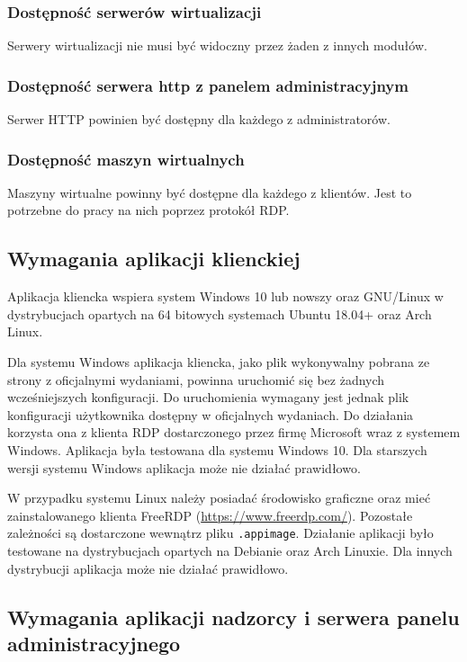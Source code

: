 \documentclass[../opis-rozwiazania.tex]{subfiles}
\begin{document}
\subsubsection{Dostępność serwerów wirtualizacji}
Serwery wirtualizacji nie musi być widoczny przez żaden z innych modułów.

\subsubsection{Dostępność serwera http z panelem administracyjnym}
Serwer HTTP powinien być dostępny dla każdego z administratorów.

\subsubsection{Dostępność maszyn wirtualnych}
Maszyny wirtualne powinny być dostępne dla każdego z klientów.
Jest to potrzebne do pracy na nich poprzez protokół RDP.

\subsection{Wymagania aplikacji klienckiej}
Aplikacja kliencka wspiera system Windows 10 lub nowszy oraz GNU/Linux w dystrybucjach opartych na 64 bitowych systemach Ubuntu 18.04+ oraz Arch Linux.

Dla systemu Windows aplikacja kliencka, jako plik wykonywalny pobrana ze strony z oficjalnymi wydaniami\parencite{ocd-client-releases}, powinna uruchomić się bez żadnych wcześniejszych konfiguracji. Do uruchomienia wymagany jest jednak plik konfiguracji użytkownika dostępny w oficjalnych wydaniach.
Do działania korzysta ona z klienta RDP dostarczonego przez firmę Microsoft wraz z systemem Windows.
Aplikacja była testowana dla systemu Windows 10.
Dla starszych wersji systemu Windows aplikacja może nie działać prawidłowo.

W przypadku systemu Linux należy posiadać środowisko graficzne oraz mieć zainstalowanego klienta FreeRDP (\url{https://www.freerdp.com/}).
Pozostałe zależności są dostarczone wewnątrz pliku \texttt{.appimage}.
Działanie aplikacji było testowane na dystrybucjach opartych na Debianie oraz Arch Linuxie.
Dla innych dystrybucji aplikacja może nie działać prawidłowo.

\subsection{Wymagania aplikacji nadzorcy i serwera panelu administracyjnego}
\end{document}
